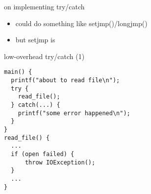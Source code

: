 \begin{frame}{on implementing try/catch}
\begin{itemize}
\item could do something like setjmp()/longjmp()
\item but setjmp is 
\end{itemize}
\end{frame}

\begin{frame}[fragile,label=lowOverTryCatch1]{low-overhead try/catch (1)}
\lstset{language=C,style=small}
\begin{lstlisting}
main() {
  printf("about to read file\n");
  try {
    read_file();
  } catch(...) {
    printf("some error happened\n");
  }
}
read_file() {
  ...
  if (open failed) {
      throw IOException();
  }
  ...
}
\end{lstlisting}
\end{frame}

